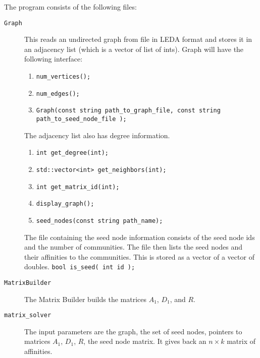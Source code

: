 \documentclass[12pt]{article}
\begin{document}
The program consists of the following files:

\begin{description}
	\item [\texttt{Graph}] This reads an undirected graph from file 
		in LEDA format and stores it in an adjacency list (which is 
		a vector of list of ints). Graph will have the following 
		interface: 
		\begin{enumerate}
			\item {\small \verb|num_vertices();|}
			\item \verb|num_edges();| 
			\item \verb|Graph(const string path_to_graph_file, const string path_to_seed_node_file );|
		\end{enumerate}	
		The adjacency list also has degree information.
		\begin{enumerate}
			\item \verb|int get_degree(int);|
			\item \verb|std::vector<int> get_neighbors(int);|
			\item \verb|int get_matrix_id(int);| 
			\item \verb|display_graph();|
			\item \verb|seed_nodes(const string path_name);|
		\end{enumerate}
		The file containing the seed node information consists of 
		the seed node ids and the number of communities. The file 
		then lists the seed nodes and their affinities to the communities.
		This is stored as a vector of a vector of doubles. 
		\verb|bool is_seed( int id );|
		 
	\item [\texttt{MatrixBuilder}] The Matrix Builder builds the 
		matrices $A_1$, $D_1$, and $R$.

	\item [\texttt{matrix\_solver}] The input parameters are 
		the graph, the set of seed nodes, pointers to matrices $A_1$, $D_1$, 
		$R$, the seed node matrix. It gives back an $n \times k$ matrix of affinities.  
\end{description}
\end{document}
